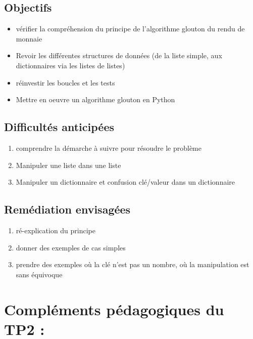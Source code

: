 \documentclass[12pt,french]{report}
\begin{document}
\subsection{Objectifs }
\begin{itemize}[$\bullet$]
	\item vérifier la compréhension du principe de l'algorithme glouton du rendu de monnaie
	\item Revoir les différentes structures de données (de la liste simple, aux dictionnaires via les listes de listes)
	\item réinvestir les boucles et les tests
	\item Mettre en oeuvre un algorithme glouton en Python
\end{itemize}
\subsection{Difficultés anticipées }
\begin{enumerate}
	\item comprendre la démarche à suivre pour résoudre le problème
	\item Manipuler une liste dans une liste
	\item Manipuler un dictionnaire et confusion clé/valeur dans un dictionnaire
\end{enumerate}
\subsection{Remédiation envisagées }
\begin{enumerate}
	\item ré-explication du principe
	\item donner des exemples de cas simples
	\item prendre des exemples où la clé n'est pas un nombre, où la manipulation est sans équivoque
\end{enumerate}
\section{Compléments pédagogiques du TP2 :}
\end{document}
